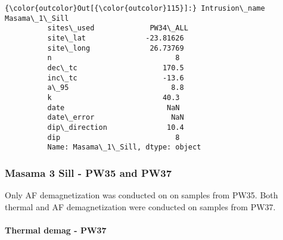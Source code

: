 \documentclass{article}
\begin{document}
            \begin{Verbatim}[commandchars=\\\{\}]
{\color{outcolor}Out[{\color{outcolor}115}]:} Intrusion\_name    Masama\_1\_Sill
          sites\_used             PW34\_ALL
          site\_lat              -23.81626
          site\_long              26.73769
          n                             8
          dec\_tc                    170.5
          inc\_tc                    -13.6
          a\_95                        8.8
          k                          40.3
          date                        NaN
          date\_error                  NaN
          dip\_direction              10.4
          dip                           8
          Name: Masama\_1\_Sill, dtype: object
\end{Verbatim}
        
    \subsubsection{Masama 3 Sill - PW35 and
PW37}\label{masama-3-sill---pw35-and-pw37}

    Only AF demagnetization was conducted on on samples from PW35. Both
thermal and AF demagnetization were conducted on samples from PW37.

    \paragraph{Thermal demag - PW37}\label{thermal-demag---pw37}
\end{document}
